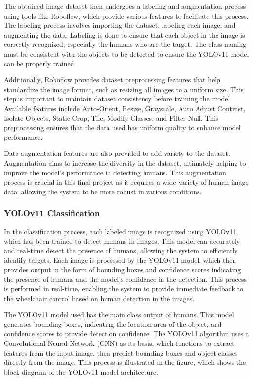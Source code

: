 The obtained image dataset then undergoes a labeling and augmentation process using tools like Roboflow, which provide various features to facilitate this process. The labeling process involves importing the dataset, labeling each image, and augmenting the data. Labeling is done to ensure that each object in the image is correctly recognized, especially the humans who are the target. The class naming must be consistent with the objects to be detected to ensure the YOLOv11 model can be properly trained.

Additionally, Roboflow provides dataset preprocessing features that help standardize the image format, such as resizing all images to a uniform size. This step is important to maintain dataset consistency before training the model. Available features include Auto-Orient, Resize, Grayscale, Auto Adjust Contrast, Isolate Objects, Static Crop, Tile, Modify Classes, and Filter Null. This preprocessing ensures that the data used has uniform quality to enhance model performance.

Data augmentation features are also provided to add variety to the dataset. Augmentation aims to increase the diversity in the dataset, ultimately helping to improve the model's performance in detecting humans. This augmentation process is crucial in this final project as it requires a wide variety of human image data, allowing the system to be more robust in various conditions.

\vspace{5pt}
\subsubsection{YOLOv11 Classification}
\label{subsubsec:YOLOv11classification}

In the classification process, each labeled image is recognized using YOLOv11, which has been trained to detect humans in images. This model can accurately and real-time detect the presence of humans, allowing the system to efficiently identify targets. Each image is processed by the YOLOv11 model, which then provides output in the form of bounding boxes and confidence scores indicating the presence of humans and the model's confidence in the detection. This process is performed in real-time, enabling the system to provide immediate feedback to the wheelchair control based on human detection in the images.

The YOLOv11 model used has the main class output of humans. This model generates bounding boxes, indicating the location area of the object, and confidence scores to provide detection confidence. The YOLOv11 algorithm uses a Convolutional Neural Network (CNN) as its basis, which functions to extract features from the input image, then predict bounding boxes and object classes directly from the image. This process is illustrated in the figure, which shows the block diagram of the YOLOv11 model architecture.

